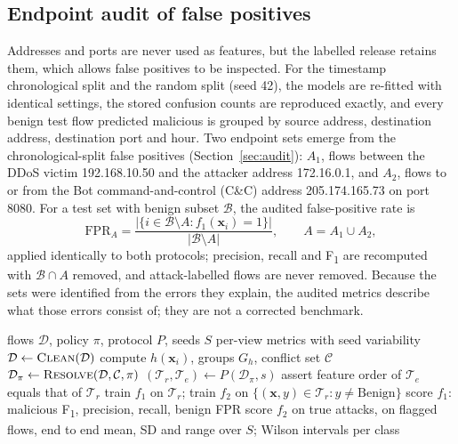 \documentclass[conference]{IEEEtran}
\newcommand{\Fone}{F\textsubscript{1}}
\begin{document}
\subsection{Endpoint audit of false positives}
\label{sec:auditmethod}
Addresses and ports are never used as features, but the labelled release retains them, which allows false positives to be inspected. For the timestamp chronological split and the random split (seed 42), the models are re-fitted with identical settings, the stored confusion counts are reproduced exactly, and every benign test flow predicted malicious is grouped by source address, destination address, destination port and hour. Two endpoint sets emerge from the chronological-split false positives (Section~\ref{sec:audit}): $A_1$, flows between the DDoS victim 192.168.10.50 and the attacker address 172.16.0.1, and $A_2$, flows to or from the Bot command-and-control (C\&C) address 205.174.165.73 on port 8080. For a test set with benign subset $\mathcal{B}$, the audited false-positive rate is
\begin{equation}
\mathrm{FPR}_A=\frac{\bigl|\{i\in\mathcal{B}\setminus A : f_1(\mathbf{x}_i)=1\}\bigr|}{|\mathcal{B}\setminus A|},\qquad A=A_1\cup A_2,
\end{equation}
applied identically to both protocols; precision, recall and \Fone{} are recomputed with $\mathcal{B}\cap A$ removed, and attack-labelled flows are never removed. Because the sets were identified from the errors they explain, the audited metrics describe what those errors consist of; they are not a corrected benchmark.

\begin{algorithm}[t]
\caption{Leakage-aware hierarchical evaluation}
\label{alg:eval}
\begin{algorithmic}[1]
\Require flows $\mathcal{D}$, policy $\pi$, protocol $P$, seeds $S$
\Ensure per-view metrics with seed variability
\State $\mathcal{D}\gets \textsc{Clean}(\mathcal{D})$ 
\State compute $h(\mathbf{x}_i)$, groups $G_h$, conflict set $\mathcal{C}$
\State $\mathcal{D}_\pi\gets \textsc{Resolve}(\mathcal{D},\mathcal{C},\pi)$
  \State $(\mathcal{T}_r,\mathcal{T}_e)\gets P(\mathcal{D}_\pi, s)$ 
  \State assert feature order of $\mathcal{T}_e$ equals that of $\mathcal{T}_r$
  \State train $f_1$ on $\mathcal{T}_r$; train $f_2$ on $\{(\mathbf{x},y)\in\mathcal{T}_r : y\neq\text{Benign}\}$
  \State score $f_1$: malicious \Fone, precision, recall, benign FPR
  \State score $f_2$ on true attacks, on flagged flows, end to end
\EndFor
\State \Return mean, SD and range over $S$; Wilson intervals per class
\end{algorithmic}
\end{algorithm}
\end{document}
